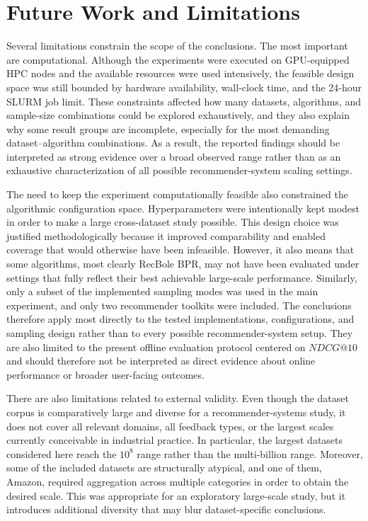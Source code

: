 \documentclass[12pt,a4paper]{article}
\begin{document}
\section{Future Work and Limitations}
Several limitations constrain the scope of the conclusions. The most important are computational. Although the experiments were executed on GPU-equipped HPC nodes and the available resources were used intensively, the feasible design space was still bounded by hardware availability, wall-clock time, and the 24-hour SLURM job limit. These constraints affected how many datasets, algorithms, and sample-size combinations could be explored exhaustively, and they also explain why some result groups are incomplete, especially for the most demanding dataset--algorithm combinations. As a result, the reported findings should be interpreted as strong evidence over a broad observed range rather than as an exhaustive characterization of all possible recommender-system scaling settings.

The need to keep the experiment computationally feasible also constrained the algorithmic configuration space. Hyperparameters were intentionally kept modest in order to make a large cross-dataset study possible. This design choice was justified methodologically because it improved comparability and enabled coverage that would otherwise have been infeasible. However, it also means that some algorithms, most clearly RecBole BPR, may not have been evaluated under settings that fully reflect their best achievable large-scale performance. Similarly, only a subset of the implemented sampling modes was used in the main experiment, and only two recommender toolkits were included. The conclusions therefore apply most directly to the tested implementations, configurations, and sampling design rather than to every possible recommender-system setup. They are also limited to the present offline evaluation protocol centered on $NDCG@10$ and should therefore not be interpreted as direct evidence about online performance or broader user-facing outcomes.

There are also limitations related to external validity. Even though the dataset corpus is comparatively large and diverse for a recommender-systems study, it does not cover all relevant domains, all feedback types, or the largest scales currently conceivable in industrial practice. In particular, the largest datasets considered here reach the $10^8$ range rather than the multi-billion range. Moreover, some of the included datasets are structurally atypical, and one of them, Amazon, required aggregation across multiple categories in order to obtain the desired scale. This was appropriate for an exploratory large-scale study, but it introduces additional diversity that may blur dataset-specific conclusions.
\end{document}
